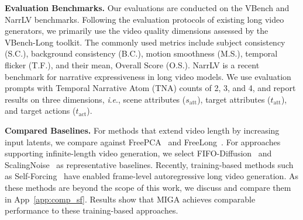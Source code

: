\documentclass{article}
\theoremstyle{plain}
\theoremstyle{definition}
\theoremstyle{remark}
\newcommand{\ie}{\textit{i}.\textit{e}.}
\begin{document}
\textbf{Evaluation Benchmarks.}
Our evaluations are conducted on the VBench \cite{huang2024vbench} and NarrLV \cite {feng2025narrlv} benchmarks.  
Following the evaluation protocols of existing long video generators, we primarily use the video quality dimensions assessed by the VBench-Long toolkit.
The commonly used metrics include subject consistency (S.C.), background consistency (B.C.), motion smoothness (M.S.), temporal flicker (T.F.), and their mean, Overall Score (O.S.).
NarrLV is a recent benchmark for narrative expressiveness in long video models. 
We use evaluation prompts with Temporal Narrative Atom (TNA) counts of 2, 3, and 4, and report results on three dimensions, \ie, scene attributes ($s_{\text{att}}$), target attributes ($t_{\text{att}}$), and target actions ($t_{\text{act}}$).


\textbf{Compared Baselines.}
For methods that extend video length by increasing input latents, we compare against FreePCA~\cite{tan2025freepca} and FreeLong~\cite{lu2024freelong}. For approaches supporting infinite-length video generation, we select FIFO-Diffusion~\cite{kim2024fifo} and ScalingNoise~\cite{yang2025scalingnoise} as representative baselines.
Recently, training-based methods such as Self-Forcing~\cite{huang2025self} have enabled frame-level autoregressive long video generation. 
As these methods are beyond the scope of this work, we discuss and compare them in App~\ref{app:comp_sf}. 
Results show that MIGA achieves comparable performance to these training-based approaches.
\end{document}
